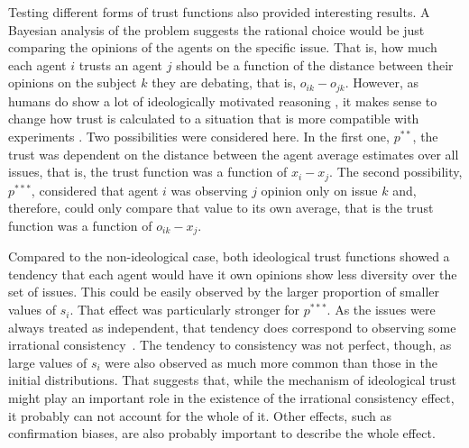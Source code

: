 \documentclass{article}
\begin{document}
{    Testing different forms of trust functions also provided interesting
    results. A Bayesian analysis of the problem suggests the rational choice
    would be just comparing the opinions of the agents on the specific issue.
    That is, how much each agent $i$ trusts an agent $j$ should be a function of
    the distance between their opinions on the subject $k$ they are debating,
    that is, $o_{ik}-o_{jk}$. However, as humans do show a lot of ideologically
    motivated reasoning \cite{mercier11a,merciersperber11a,kahanetal11}, it
    makes sense to change how trust is calculated to a situation that is more
    compatible with experiments \cite{jerit2012partisan,
      nyhan2010corrections,reedy2014voters, flynn2017nature}. Two possibilities
    were considered here. In the first one, \( p^{**}\), the trust was dependent
    on the distance between the agent average estimates over all issues, that
    is, the trust function was a function of $x_{i}-x_{j}$. The second
    possibility, \( p^{***}\), considered that agent $i$ was observing $j$
    opinion only on issue $k$ and, therefore, could only compare that value to
    its own average, that is the trust function was a function of
    $o_{ik}-x_{j}$.

    Compared to the non-ideological case, both ideological trust functions
    showed a tendency that each agent would have it own opinions show less
    diversity over the set of issues. This could be easily observed by the
    larger proportion of smaller values of $s_i$. That effect was particularly
    stronger for \( p^{***}\). As the issues were always treated as
    independent, that tendency does correspond to observing some irrational
    consistency~\cite{jervis76a}. The tendency to consistency was not perfect,
    though, as large values of $s_i$ were also observed as much more common than
    those in the initial distributions. That suggests that, while the mechanism
    of ideological trust might play an important role in the existence of the
    irrational consistency effect, it probably can not account for the whole of
    it. Other effects, such as confirmation biases, are also probably important
    to describe the whole effect.

}
\end{document}
